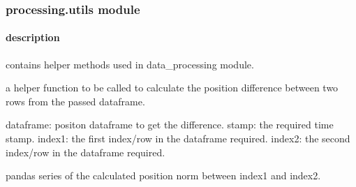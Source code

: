 \documentclass[letterpaper,10pt,english]{sphinxmanual}
\begin{document}
\subsubsection{processing.utils module}
\label{\detokenize{processing:processing-utils-module}}

\paragraph{description}
\label{\detokenize{processing:id1}}
\sphinxAtStartPar
contains helper methods used in data\_processing module.
\label{\detokenize{processing:processing-utils-ref}}\label{\detokenize{processing:module-processing.utils}}

\begin{fulllineitems}
\label{\detokenize{processing:processing.utils.calc_pos_mag_diff}}
\pysigstartsignatures
{}
\pysigstopsignatures\begin{description}
\sphinxAtStartPar
a helper function to be called to calculate the position difference between two rows from the passed dataframe.

\sphinxAtStartPar
dataframe: positon dataframe to get the difference.
stamp:     the required time stamp. 
index1:    the first index/row in the dataframe required.
index2:    the second index/row in the dataframe required.

\sphinxAtStartPar
pandas series of the calculated position norm between index1 and index2.

\end{description}

\end{fulllineitems}
\end{document}
